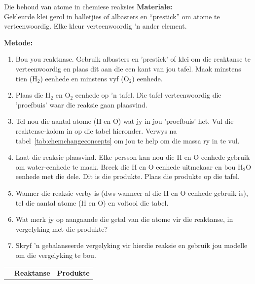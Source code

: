             \begin{activity}{Die behoud van atome in chemiese reaksies}
            \nopagebreak
            \label{m38711*id64844}\noindent
\textbf{Materiale:} \\ Gekleurde klei gerol in balletjies of albasters en “prestick” om atome te verteenwoordig. Elke kleur verteenwoordig 'n ander element.
        \par 
      \label{m38711*id64882}\noindent
\textbf{Metode:}\\
      \label{m38711*id64889}\begin{enumerate}[noitemsep, label=\textbf{\arabic*}. ] 
\label{m38711*uid36}\item Bou you reaktnase. Gebruik albasters en 'prestick' of klei om die reaktanse te verteenwoordig en plaas dit aan die een kant van jou tafel. Maak minstens tien ($\text{H}_{2}$) eenhede en minstens vyf ($\text{O}_{2}$) eenhede.
\label{m38711*uid37}\item Plaas die $\text{H}_{2}$ en $\text{O}_{2}$ eenhede op 'n tafel. Die tafel verteenwoordig die 'proefbuis' waar die reaksie gaan plaasvind.
\label{m38711*uid38}\item Tel nou die aantal atome ($\text{H}$ en $\text{O}$) wat jy in jou 'proefbuis' het. Vul die reaktense-kolom in op die tabel hieronder. Verwys na tabel~\ref{tab:chemchangeconcepts} om jou te help om die massa ry in te vul.
\label{m38711*uid39}\item Laat die reaksie plaasvind. Elke persson kan nou die $\text{H}$ en $\text{O}$ eenhede gebruik om water-eenhede te maak. Breek die $\text{H}$ en $\text{O}$ eenhede uitmekaar en bou $\text{H}_{2}\text{O}$ eenhede met die dele. Dit is die produkte. Plaas die produkte op die tafel. 
\item Wanner die reaksie verby is (dws wanneer al die $\text{H}$ en $\text{O}$ eenhede gebruik is), tel die aantal atome ($\text{H}$ en $\text{O}$) en voltooi die tabel.
\item Wat merk jy op aangaande die getal van die atome vir die reaktanse, in vergelyking met die produkte?
\item Skryf 'n gebalanseerde vergelyking vir hierdie reaksie en gebruik jou modelle om die vergelyking te bou.
\end{enumerate}
        \par 
\begin{table}[H]
 \begin{center}
  \begin{tabular}{|l|l||l|} \hline
& \textbf{Reaktanse} & \textbf{Produkte} \\ 

\end{tabular}
\end{center}
\end{table}
\end{activity}
